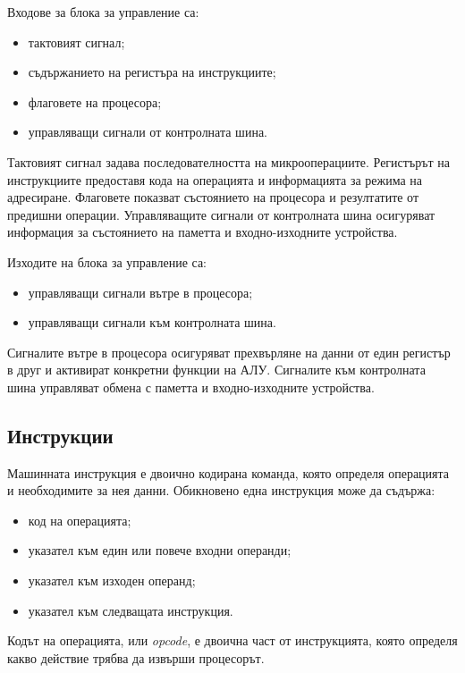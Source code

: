 Входове за блока за управление са:

\begin{itemize}
    \item тактовият сигнал;
    \item съдържанието на регистъра на инструкциите;
    \item флаговете на процесора;
    \item управляващи сигнали от контролната шина.
\end{itemize}

Тактовият сигнал задава последователността на микрооперациите. Регистърът на инструкциите предоставя кода на операцията и информацията за режима на адресиране. Флаговете показват състоянието на процесора и резултатите от предишни операции. Управляващите сигнали от контролната шина осигуряват информация за състоянието на паметта и входно-изходните устройства.

Изходите на блока за управление са:

\begin{itemize}
    \item управляващи сигнали вътре в процесора;
    \item управляващи сигнали към контролната шина.
\end{itemize}

Сигналите вътре в процесора осигуряват прехвърляне на данни от един регистър в друг и активират конкретни функции на АЛУ. Сигналите към контролната шина управляват обмена с паметта и входно-изходните устройства.

\subsection{Инструкции}\label{s:9.3.4}

Машинната инструкция е двоично кодирана команда, която определя операцията и необходимите за нея данни. Обикновено една инструкция може да съдържа:

\begin{itemize}
    \item код на операцията;
    \item указател към един или повече входни операнди;
    \item указател към изходен операнд;
    \item указател към следващата инструкция.
\end{itemize}

\begin{defn}
Кодът на операцията, или \emph{opcode}, е двоична част от инструкцията, която определя какво действие трябва да извърши процесорът.
\end{defn}

